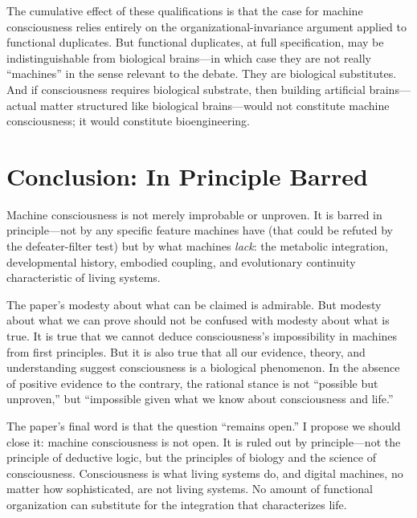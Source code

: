 \documentclass[11pt]{article}
\begin{document}
The cumulative effect of these qualifications is that the case for machine consciousness relies entirely on the organizational-invariance argument applied to functional duplicates. But functional duplicates, at full specification, may be indistinguishable from biological brains---in which case they are not really ``machines'' in the sense relevant to the debate. They are biological substitutes. And if consciousness requires biological substrate, then building artificial brains---actual matter structured like biological brains---would not constitute machine consciousness; it would constitute bioengineering.

\section{Conclusion: In Principle Barred}

Machine consciousness is not merely improbable or unproven. It is barred in principle---not by any specific feature machines have (that could be refuted by the defeater-filter test) but by what machines \textit{lack}: the metabolic integration, developmental history, embodied coupling, and evolutionary continuity characteristic of living systems.

The paper's modesty about what can be claimed is admirable. But modesty about what we can prove should not be confused with modesty about what is true. It is true that we cannot deduce consciousness's impossibility in machines from first principles. But it is also true that all our evidence, theory, and understanding suggest consciousness is a biological phenomenon. In the absence of positive evidence to the contrary, the rational stance is not ``possible but unproven,'' but ``impossible given what we know about consciousness and life.''

The paper's final word is that the question ``remains open.'' I propose we should close it: machine consciousness is not open. It is ruled out by principle---not the principle of deductive logic, but the principles of biology and the science of consciousness. Consciousness is what living systems do, and digital machines, no matter how sophisticated, are not living systems. No amount of functional organization can substitute for the integration that characterizes life.
\end{document}
